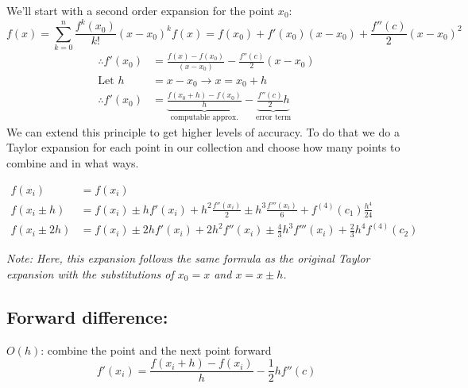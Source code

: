 \documentclass[12pt]{article}
\begin{document}
We'll start with a second order expansion for the point $x_0$:
\[
f(x) = \sum_{k=0}^n \frac{f^k(x_0)}{k!}(x-x_0)^k
f(x) = f(x_0) + f'(x_0)(x - x_0) + \frac{f''(c)}{2}(x-x_0)^2 \]
\begin{align*}
% 
\therefore f'(x_0) &= \frac{f(x) - f(x_0)}{(x - x_0)} - \frac{f''(c)}{2}(x-x_0) \\
%
\text{Let } h &= x-x_0 \rightarrow x = x_0 + h \\
%
\therefore f'(x_0) &= \underbrace{\frac{f(x_0 + h) - f(x_0)}{h}}_{\text{computable approx.}} - \underbrace{\frac{f''(c)}{2}h}_{\text{error term}}
\end{align*}
%
We can extend this principle to get higher levels of accuracy. To do that we do a Taylor expansion for each point in our collection and choose how many points to combine and in what ways. 
%
\begin{center}
\end{center}
%
\vspace*{-2em}
\begin{align*}
f(x_i) &= f(x_i)\\
%
f(x_i \pm h) &= f(x_i) \pm hf'(x_i) + h^2\frac{f''(x_i)}{2} \pm h^3\frac{f'''(x_i)}{6} + f^{(4)}(c_1)\frac{h^4}{24} \\
%
f(x_i \pm 2h) &= f(x_i) \pm 2h f'(x_i) + 2 h^2 f''(x_i) \pm \frac{4}{3} h^3 f'''(x_i) + \frac{2}{3}h^4 f^{(4)}(c_2)
\end{align*}

\textit{Note: Here, this expansion follows the same formula as the original Taylor expansion with the substitutions of $x_0=x$ and $x=x \pm h$.}

\subsection*{Forward difference:}
\underline{$O(h)$}: combine the point and the next point forward
\[f'(x_i) = \frac{f(x_i + h) - f(x_i)}{h} - \frac{1}{2}hf''(c)\]
\end{document}
